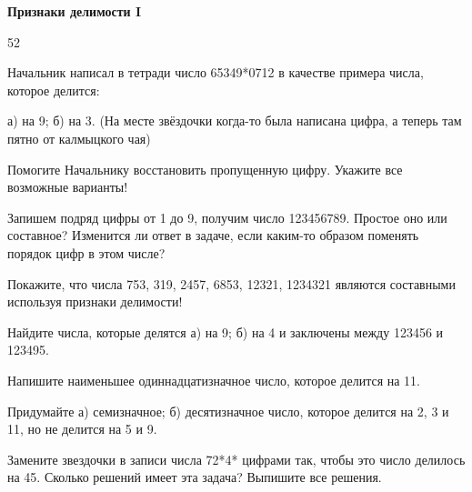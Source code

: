 \centerline{\bf \Huge Признаки делимости I}

\begin{flushright}
        \scriptsize{52}
\end{flushright}

 Начальник написал в тетради число 65349*0712 в качестве примера числа, которое делится: 

а) на 9; б) на 3. (На месте звёздочки когда-то была написана цифра, а теперь там пятно от калмыцкого чая)

Помогите Начальнику восстановить пропущенную цифру. Укажите все возможные варианты!

 Запишем подряд цифры от 1 до 9, получим число 123456789. Простое оно или составное? Изменится ли ответ в задаче, если каким-то образом поменять порядок цифр в этом числе?

 Покажите, что числа 753, 319, 2457, 6853, 12321, 1234321 являются составными используя признаки делимости!

 Найдите числа, которые делятся а) на 9; б) на 4 и заключены между 123456 и 123495.

 Напишите наименьшее одиннадцатизначное число, которое делится на 11.

 Придумайте а) семизначное; б) десятизначное число, которое делится на 2, 3 и 11, но не
делится на 5 и 9.

 Замените звездочки в записи числа 72*4* цифрами так, чтобы это число делилось на 45.
Сколько решений имеет эта задача? Выпишите все решения.